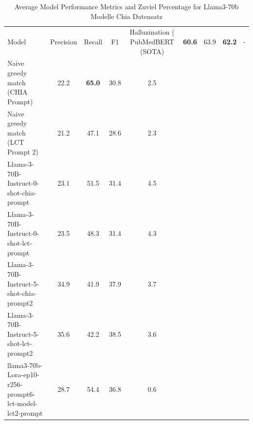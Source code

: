 \begin{table}[ht]
\centering
\begin{tabular}{lcccc}
\toprule
Model & Precision & Recall & F1 & Halluzination (%
\midrule
PubMedBERT (SOTA) & \textbf{60.6} & 63.9 & \textbf{62.2} & - \\
 Naive greedy match (CHIA Prompt) & 22.2 & \textbf{65.0} & 30.8 & 2.5 \\
 Naive greedy match (LCT Prompt 2) & 21.2 & 47.1 & 28.6 & 2.3 \\
Llama-3-70B-Instruct-0-shot-chia-prompt & 23.1 & 51.5 & 31.4 & 4.5 \\
Llama-3-70B-Instruct-0-shot-lct-prompt & 23.5 & 48.3 & 31.4 & 4.3 \\
Llama-3-70B-Instruct-5-shot-chia-prompt2 & 34.9 & 41.9 & 37.9 & 3.7 \\
Llama-3-70B-Instruct-5-shot-lct-prompt2 & 35.6 & 42.2 & 38.5 & 3.6 \\
llama3-70b-Lora-ep10-r256-prompt6-lct-model-lct2-prompt & 28.7 & 54.4 & 36.8 & 0.6 \\
\bottomrule
\end{tabular}
\caption{Average Model Performance Metrics and Zuviel Percentage for Llama3-70b Modelle Chia Datensatz}
\label{tab:avg_model_metrics}
\end{table}
